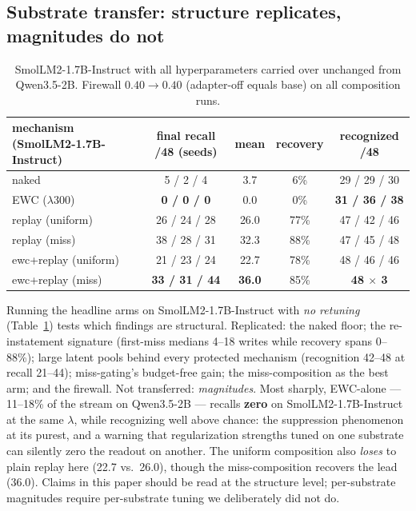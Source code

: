 \documentclass[11pt]{article}
\newcommand{\qwen}{Qwen3.5-2B}
\newcommand{\smol}{SmolLM2-1.7B-Instruct}
\begin{document}
\subsection{Substrate transfer: structure replicates, magnitudes do not}\label{sec:substrate}

\begin{table}[t]
\centering\small
\begin{tabular}{lcccc}
\toprule
mechanism (\smol{}) & final recall /48 (seeds) & mean & recovery & recognized /48 \\
\midrule
naked            & 5 / 2 / 4    & 3.7  & 6\%  & 29 / 29 / 30 \\
EWC ($\lambda$300) & \textbf{0 / 0 / 0} & 0.0 & 0\% & \textbf{31 / 36 / 38} \\
replay (uniform) & 26 / 24 / 28 & 26.0 & 77\% & 47 / 42 / 46 \\
replay (miss)    & 38 / 28 / 31 & 32.3 & 88\% & 47 / 45 / 48 \\
ewc+replay (uniform) & 21 / 23 / 24 & 22.7 & 78\% & 48 / 46 / 46 \\
ewc+replay (miss) & \textbf{33 / 31 / 44} & \textbf{36.0} & 85\% & \textbf{48 $\times$ 3} \\
\bottomrule
\end{tabular}
\caption{\smol{} with all hyperparameters carried over unchanged from \qwen{}. Firewall $0.40 \to
0.40$ (adapter-off equals base) on all composition runs.}
\label{tab:smol}
\end{table}

Running the headline arms on \smol{} with \emph{no retuning} (Table~\ref{tab:smol}) tests which
findings are structural. Replicated: the naked floor; the re-instatement signature (first-miss
medians 4--18 writes while recovery spans 0--88\%); large latent pools behind every protected
mechanism (recognition 42--48 at recall 21--44); miss-gating's budget-free gain; the miss-composition
as the best arm; and the firewall. Not transferred: \emph{magnitudes}. Most sharply, EWC-alone ---
11--18\% of the stream on \qwen{} --- recalls \textbf{zero} on \smol{} at the same $\lambda$, while
recognizing well above chance: the suppression phenomenon at its purest, and a warning that
regularization strengths tuned on one substrate can silently zero the readout on another. The uniform
composition also \emph{loses} to plain replay here (22.7 vs.\ 26.0), though the miss-composition
recovers the lead (36.0). Claims in this paper should be read at the structure level; per-substrate
magnitudes require per-substrate tuning we deliberately did not do.
\end{document}
